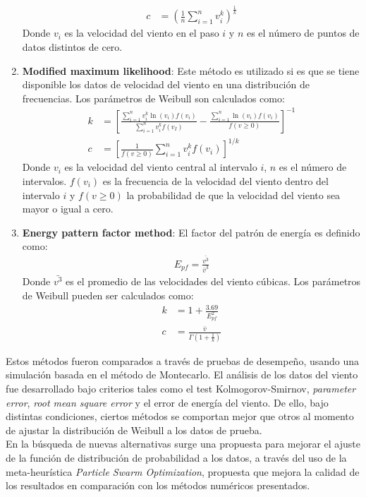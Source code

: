 \begin{enumerate}
\begin{align}
            c &= (\frac{1}{n}\sum_{i=1}^n v_i^k)^{\frac{1}{k}}
        \end{align}    
         Donde $v_i$ es la velocidad del viento en el paso $i$ y $n$ es el número de puntos de datos distintos de cero. 
    \item \textbf{Modified maximum likelihood}: Este método es utilizado si es que se tiene disponible los datos de velocidad del viento en una distribución de frecuencias. Los parámetros de Weibull son calculados como:
        \begin{align}
            k &= [\frac{\sum_{i=1}^n v_i^k \ln(v_i)f(v_i)}{\sum_{i=1}^n v_i^kf(v_I)} - \frac{\sum_{i=1}^n\ln(v_i)f(v_i)}{f(v \geq 0)}]^{-1}\\
            c &= [\frac{1}{f(v \geq 0)}\sum_{i=1}^n v_i^{k}f(v_i)]^{1/k}
        \end{align}
         Donde $v_i$ es la velocidad del viento central al intervalo $i$, $n$ es el número de intervalos. $f(v_i)$ es la frecuencia de la velocidad del viento dentro del intervalo $i$ y $f(v \geq 0)$ la probabilidad de que la velocidad del viento sea mayor o igual a cero.
    \item \textbf{Energy pattern factor method}: El factor del patrón de energía es definido como:
        \begin{align}
            E_{pf} = \frac{\bar{v^3}}{\bar{v}^3}
        \end{align}   
         Donde $\bar{v^3}$ es el promedio de las velocidades del viento cúbicas. Los parámetros de Weibull pueden ser calculados como:
        \begin{align}
            k &= 1 + \frac{3.69}{E_{pf}^2}\\
            c &= \frac{\bar{v}}{\Gamma(1 + \frac{1}{k})}
        \end{align}    
 \end{enumerate}     
 Estos métodos fueron comparados a través de pruebas de desempeño, usando una simulación basada en el método de Montecarlo. El análisis de los datos del viento fue desarrollado bajo criterios tales como el test Kolmogorov-Smirnov, \emph{parameter error}, \emph{root mean square error} y el error de energía del viento. De ello, bajo distintas condiciones, ciertos métodos se comportan mejor que otros al momento de ajustar la distribución de Weibull a los datos de prueba. \\
 En la búsqueda de nuevas alternativas surge una propuesta para mejorar el ajuste de la función de distribución de probabilidad a los datos, a través del uso de la meta-heurística \emph{Particle Swarm Optimization}, propuesta que mejora la calidad de los resultados en comparación con los métodos numéricos presentados.  
